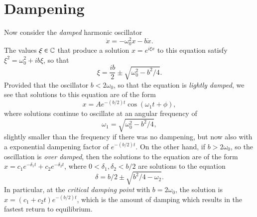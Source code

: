 \section{Dampening}

Now consider the \emph{damped} harmonic oscillator
%
\[ \ddot{x} = -\omega_0^2 x - b \dot{x}. \]
%
The values $\xi \in \operatorname{\mathbb{C}}$ that produce a solution $x = e^{i \xi x}$ to this equation satisfy $\xi^2 = \omega_0^2 + ib \xi$, so that
\[ \xi = \frac{ib}{2} \pm \sqrt{\omega_0^2 - b^2/4}. \]
%
Provided that the oscillator $b < 2 \omega_0$, so that the equation is \emph{lightly damped}, we see that solutions to this equation are of the form
%
\[ x = A e^{- (b/2) t} \cos(\omega_1 t + \phi), \]
%
where solutions continue to oscillate at an angular frequency of
%
\[ \omega_1 = \sqrt{\omega_0^2 - b^2 / 4}, \]
%
slightly smaller than the frequency if there was no dampening, but now also with a exponential dampening factor of $e^{-(b/2)t}$. On the other hand, if $b > 2 \omega_0$, so the oscillation is \emph{over damped}, then the solutions to the equation are of the form $x = c_1 e^{-\delta_1 t} + c_2 e^{-\delta_2 t}$, where $0 < \delta_1, \delta_2 < b/2$ are solutions to the equation
%
\[ \delta = b/2 \pm \sqrt{b^2 / 4 - \omega_2}. \]
%
In particular, at the \emph{critical damping point} with $b = 2 \omega_0$, the solution is $x = (c_1 + c_2 t) e^{- (b/2) t}$, which is the amount of damping which results in the fastest return to equilibrium.

